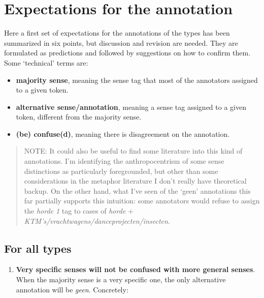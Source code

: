 \documentclass[
]{book}
\providecommand{\tightlist}{%
  \setlength{\itemsep}{0pt}\setlength{\parskip}{0pt}}
\begin{document}
\hypertarget{expectations-for-the-annotation}{%
\section{Expectations for the annotation}\label{expectations-for-the-annotation}}

Here a first set of expectations for the annotations of the types has been summarized in six points, but discussion and revision are needed. They are formulated as predictions and followed by suggestions on how to confirm them. Some `technical' terms are:

\begin{itemize}
\tightlist
\item
  \textbf{majority sense}, meaning the sense tag that most of the annotators assigned to a given token.
\item
  \textbf{alternative sense/annotation}, meaning a sense tag assigned to a given token, different from the majority sense.
\item
  \textbf{(be) confuse(d)}, meaning there is disagreement on the annotation.
\end{itemize}

\begin{quote}
NOTE: It could also be useful to find some literature into this kind of annotations. I'm identifying the anthropocentrism of some sense distinctions as particularly foregrounded, but other than some considerations in the metaphor literature I don't really have theoretical backup. On the other hand, what I've seen of the `geen' annotations this far partially supports this intuition: some annotators would refuse to assign the \emph{horde 1} tag to cases of \emph{horde} + \emph{KTM's/vrachtwagens/danceprojecten/insecten}.
\end{quote}

\hypertarget{for-all-types}{%
\subsection{For all types}\label{for-all-types}}

\begin{enumerate}
\def\labelenumi{\arabic{enumi}.}
\tightlist
\item
  \textbf{Very specific senses will not be confused with more general senses}.
  When the majority sense is a very specific one, the only alternative annotation will be \emph{geen}.
  Concretely:
\end{enumerate}
\end{document}
